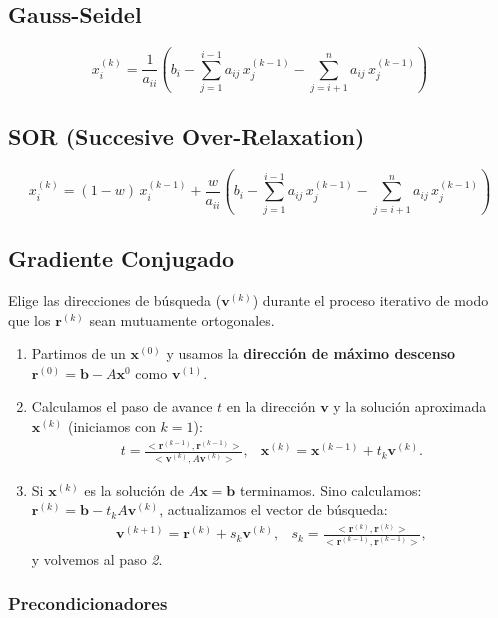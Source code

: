 \documentclass[10pt,a4paper]{article}
\begin{document}
\subsection{Gauss-Seidel}
\[x_i^{(k)} = \frac{1}{a_{ii}} \left(b_i - \sum_{j=1}^{i-1} a_{ij} \, x_j^{(k-1)} - \sum_{j=i+1}^{n} a_{ij} \, x_j^{(k-1)} \right) \]

\subsection{SOR (Succesive Over-Relaxation)}
\[x_i^{(k)} = (1-w)\, x_i^{(k-1)} + \frac{w}{a_{ii}} \left(b_i - \sum_{j=1}^{i-1} a_{ij} \, x_j^{(k-1)} - \sum_{j=i+1}^{n} a_{ij} \, x_j^{(k-1)} \right) \]

\subsection{Gradiente Conjugado}
Elige las direcciones de búsqueda ($\mathbf{v}^{(k)}$) durante el proceso iterativo de modo que los $\mathbf{r}^{(k)}$ sean mutuamente ortogonales.
\begin{enumerate}
\item Partimos de un $\mathbf{x}^{(0)}$ y usamos la \textbf{dirección de máximo descenso} $\mathbf{r}^{(0)} = \mathbf{b} - A \mathbf{x}^{0}$ como $\mathbf{v}^{(1)}$.
\item Calculamos el paso de avance $t$ en la dirección $\mathbf{v}$ y la solución aproximada $\mathbf{x}^{(k)}$ (iniciamos con $k = 1$):
\begin{align*}
&t = \frac{<\mathbf{r}^{(k-1)}, \mathbf{r}^{(k-1)}>}{<\mathbf{v}^{(k)},A \mathbf{v}^{(k)}>}, 
&\mathbf{x}^{(k)} = \mathbf{x}^{(k-1)}+t_{k}\mathbf{v}^{(k)}.&
\end{align*}
\item Si $\mathbf{x}^{(k)}$ es la solución de $A\mathbf{x}=\mathbf{b}$ terminamos. Sino calculamos: $\mathbf{r}^{(k)} = \mathbf{b} - t_k A \mathbf{v}^{(k)}$, actualizamos el vector de búsqueda: 
\begin{align*}
&\mathbf{v}^{(k+1)}=\mathbf{r}^{(k)}+s_k\mathbf{v}^{(k)},
&s_k = \frac{<\mathbf{r}^{(k)}, \mathbf{r}^{(k)}>}{<\mathbf{r}^{(k-1)}, \mathbf{r}^{(k-1)}>},&
\end{align*}
y volvemos al paso \textit{2}.
\end{enumerate}

\subsubsection{Precondicionadores}
\end{document}
